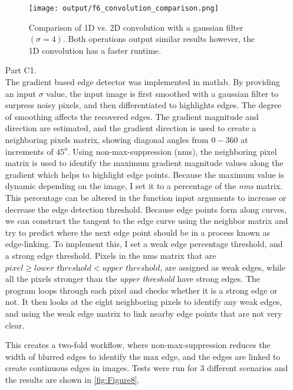 \documentclass[12pt]{report}
\begin{document}
\begin{enumerate}
    \begin{figure}[H]
        \centering
        \texttt{[image: output/f6\_convolution\_comparison.png]}
        \caption{Comparison of 1D vs. 2D convolution with a gaussian filter $(\sigma=4)$. Both operations output similar results however, the 1D convolution has a faster runtime.}
        \label{fig:Figure7}
    \end{figure}

    \item[Part C1.]
    \ \\
    The gradient based edge detector was implemented in matlab. By providing an input $\sigma$ value, the input image is first smoothed with a gaussian filter to surpress 
    noisy pixels, and then differentiated to highlights edges. The degree of smoothing affects the recovered edges. The gradient magnitude and direction are estimated, and 
    the gradient direction is used to create a neighboring pixels matrix, showing diagonal angles from $0-360$ at increments of $45^o$. Using non-max-suppression (nms), the 
    neighboring pixel matrix is used to identify the maximum gradient magnitude values along the gradient which helps to highlight edge points. Because the maximum value is dynamic 
    depending on the image, I set it to a percentage of the \emph{nms} matrix. This percentage can be altered in the function input arguments to increase or decrease the 
    edge detection threshold. Because edge points form along curves, we can construct the tangent to the edge curve using the neighbor matrix and try to predict where the 
    next edge point should be in a process known as edge-linking. To implement this, I set a weak edge percentage threshold, and a strong edge threshold. Pixels in the nms matrix 
    that are $ \textit{pixel} \ge \textit{lower threshold} < \textit{upper threshold}$, are assigned as weak edges, while all the pixels stronger than the \textit{upper threshold} 
    have strong edges. The program loops through each pixel and checks whether it is a strong edge or not. It then looks at the eight neighboring pixels to identify any weak 
    edges, and using the weak edge matrix to link nearby edge points that are not very clear.  
    
    This creates a two-fold workflow, where non-max-suppression reduces the width of blurred edges to identify the max edge, and the edges are linked to create continuous edges 
    in images. Tests were run for 3 different scenarios and the results are shown in  \autoref{fig:Figure8}.


\end{enumerate}
\end{document}
